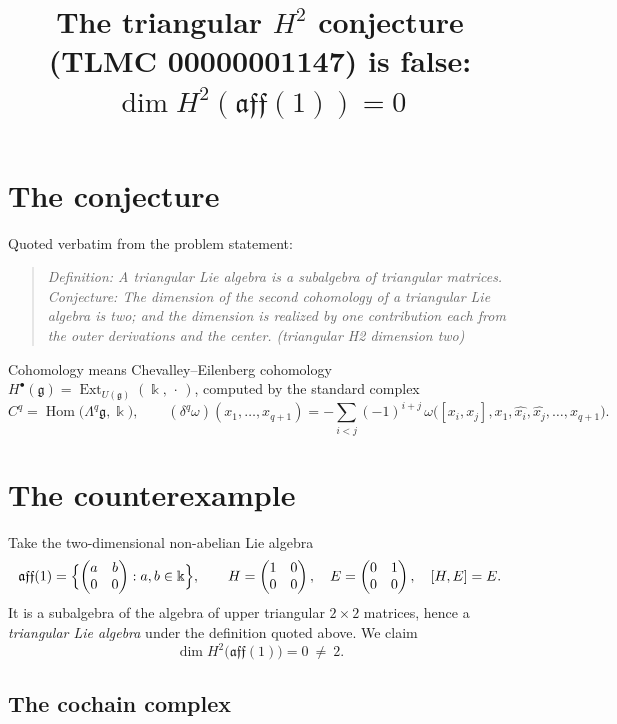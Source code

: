 \documentclass[11pt]{article}
\title{The triangular $H^2$ conjecture (TLMC 00000001147) is false:\\ $\dim H^2(\mathfrak{aff}(1))=0$}
\author{}
\date{}
\begin{document}
\maketitle

\section{The conjecture}

Quoted verbatim from the problem statement:

\begin{quote}
\itshape Definition: A triangular Lie algebra is a subalgebra of triangular matrices. Conjecture: The dimension of the second cohomology of a triangular Lie algebra is two; and the dimension is realized by one contribution each from the outer derivations and the center. (triangular H2 dimension two)
\end{quote}

Cohomology means Chevalley--Eilenberg cohomology $H^\bullet(\mathfrak{g}) = \operatorname{Ext}_{U(\mathfrak{g})}(\Bbbk,\,\cdot\,)$, computed by the standard complex
\[
C^q=\operatorname{Hom}\bigl(\Lambda^q\mathfrak{g},\Bbbk\bigr),\qquad
(\delta^q\omega)(x_1,\dots,x_{q+1})=-\sum_{i<j}(-1)^{i+j}\,\omega\bigl([x_i,x_j],x_1,\widehat{x_i},\widehat{x_j},\dots,x_{q+1}\bigr).
\]

\section{The counterexample}

Take the two-dimensional non-abelian Lie algebra
\[
\mathfrak{aff}(1)=\Bigl\{\begin{pmatrix} a& b\\ 0& 0\end{pmatrix}: a,b\in\Bbbk\Bigr\},
\qquad
H=\begin{pmatrix}1&0\\0&0\end{pmatrix},\quad
E=\begin{pmatrix}0&1\\0&0\end{pmatrix},\quad
[H,E]=E .
\]
It is a subalgebra of the algebra of upper triangular $2\times2$ matrices, hence a \emph{triangular Lie algebra} under the definition quoted above. We claim
\[
\dim H^2\bigl(\mathfrak{aff}(1)\bigr)=0\ \neq\ 2 .
\]

\subsection{The cochain complex}
\end{document}
